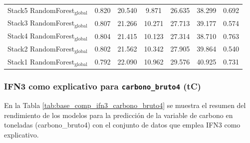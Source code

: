 \begin{table}
{\begin{tabular}{p{4.5cm}cccccc}
        Stack5 RandomForest$_{\text{global}}$ & 0.820 & 20.540 & 9.871 & 26.635 & 38.299 & 0.692 \\
        Stack3 RandomForest$_{\text{global}}$ & 0.807 & 21.266 & 10.271 & 27.713 & 39.177 & 0.574 \\
        Stack4 RandomForest$_{\text{global}}$ & 0.804 & 21.415 & 10.123 & 27.314 & 38.710 & 0.763 \\
        Stack2 RandomForest$_{\text{global}}$ & 0.802 & 21.562 & 10.342 & 27.905 & 39.864 & 0.540 \\
        Stack1 RandomForest$_{\text{global}}$ & 0.792 & 22.090 & 10.962 & 29.576 & 40.925 & 0.731 \\
            \bottomrule
    \end{tabular}
    }
\end{table}

\subsubsection{IFN3 como explicativo para \texttt{carbono\_bruto4} (tC)}


En la Tabla \ref{tab:base_comp_ifn3_carbono_bruto4} se muestra el resumen del rendimiento de los modelos para la predicción de la variable de carbono en toneladas (carbono\_bruto4) con el conjunto de datos que emplea IFN3 como explicativo.

